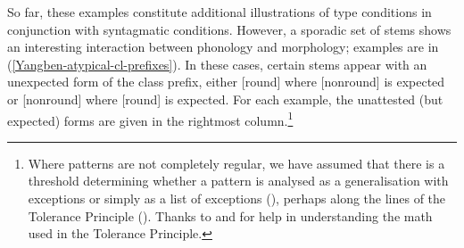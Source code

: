 So far, these examples constitute additional illustrations of type conditions in conjunction with syntagmatic conditions. However, a sporadic set of stems shows an interesting interaction between phonology and morphology; examples are in (\ref{Yangben-atypical-cl-prefixes}). In these cases, certain stems appear with an unexpected form of the class prefix, either [round] where [nonround] is expected or [nonround] where [round] is expected. For each example, the unattested (but expected) forms are given in the rightmost column.\footnote{Where patterns are not completely regular, we have assumed that there is a threshold determining whether a pattern is analysed as a generalisation with exceptions or simply as a list of exceptions (\citealt{Archangeli+:2012McGill, Archangeli+:2012Smith}), perhaps along the lines of the Tolerance Principle (\citealt{Yang:2016}). Thanks to  and
for help in understanding the math used in the Tolerance Principle.}
 
